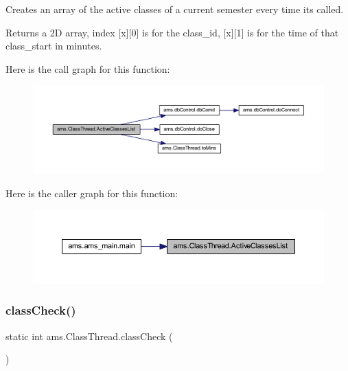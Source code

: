 Creates an array of the active classes of a current semester every time it\textquotesingle{}s called. \begin{DoxyReturn}{Returns}
a 2D array, index \mbox{[}x\mbox{]}\mbox{[}0\mbox{]} is for the class\+\_\+id, \mbox{[}x\mbox{]}\mbox{[}1\mbox{]} is for the time of that class\+\_\+start in minutes. 
\end{DoxyReturn}
Here is the call graph for this function\+:\nopagebreak
\begin{figure}[H]
\begin{center}
\leavevmode
\includegraphics[width=350pt]{classams_1_1_class_thread_addadbfedff6d9cc822345caa787ad587_cgraph}
\end{center}
\end{figure}
Here is the caller graph for this function\+:\nopagebreak
\begin{figure}[H]
\begin{center}
\leavevmode
\includegraphics[width=350pt]{classams_1_1_class_thread_addadbfedff6d9cc822345caa787ad587_icgraph}
\end{center}
\end{figure}
\mbox{\label{classams_1_1_class_thread_a7b05781a31721bb8ee9f4c40203bef72}} 
\subsubsection{\texorpdfstring{classCheck()}{classCheck()}}
{\footnotesize\ttfamily static int ams.\+Class\+Thread.\+class\+Check (\begin{DoxyParamCaption}{ }\end{DoxyParamCaption})\hspace{0.3cm}{\ttfamily [static]}}

